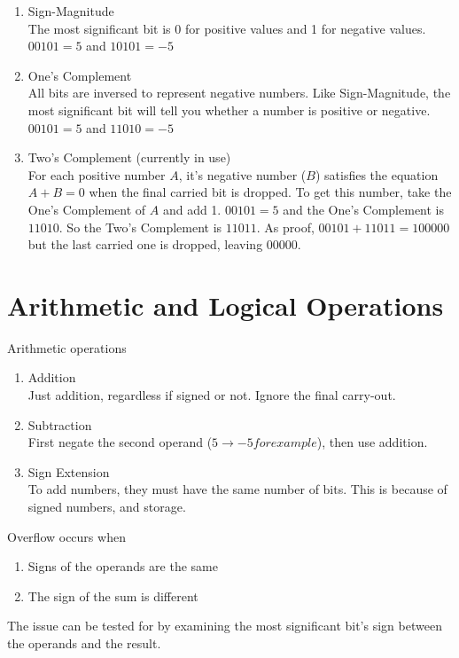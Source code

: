 \documentclass{article}
\begin{document}
\begin{enumerate}
  \item {
  Sign-Magnitude\\
  The most significant bit is 0 for positive values and 1 for negative values.\\
  $00101 = 5$ and $10101 = -5$
  }
  \item {
  One's Complement\\
  All bits are inversed to represent negative numbers. Like Sign-Magnitude, the most significant bit will tell you whether a number is positive or negative.\\
  $00101 = 5$ and $11010 = -5$
  }
  \item {
  Two's Complement (currently in use)\\
  For each positive number $A$, it's negative number ($B$) satisfies the equation $A + B = 0$ when the final carried bit is dropped. To get this number, take the One's Complement of $A$ and add 1.
  $00101 = 5$ and the One's Complement is $11010$. So the Two's Complement is $11011$. As proof, $00101 + 11011 = 100000$ but the last carried one is dropped, leaving $00000$.
  }
\end{enumerate}

\section{Arithmetic and Logical Operations}
Arithmetic operations
\begin{enumerate}
  \item {Addition\\Just addition, regardless if signed or not. Ignore the final carry-out.}
  \item {Subtraction\\First negate the second operand ($5 \to -5 for example$), then use addition.}
  \item {Sign Extension\\To add numbers, they must have the same number of bits. This is because of signed numbers, and storage.}
\end{enumerate}

Overflow occurs when
\begin{enumerate}
  \item Signs of the operands are the same
  \item The sign of the sum is different
\end{enumerate}
The issue can be tested for by examining the most significant bit's sign between the operands and the result.
\end{document}
